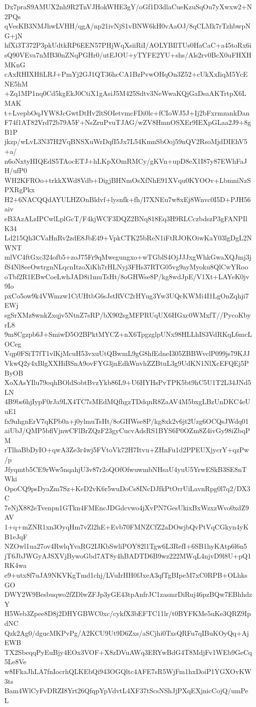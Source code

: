 Dx7praS9AMUX2nh9R2TnVJHokWHE3gY/oGf1D3dlaCueKzuSqOu7yXwxw2+N2PQs
qVesKB3NMJhwLVHH/qgA/np21ivNjS1vBNW6kH0vAaOJ/8qCLMk7rTzhbwpNG+jN
hfXi3T372P3pkUdtkRP6EEN57PHjWqXsiiRiI/AOLYBIlTUs0HaCaC+a45toRx6i
sQ90VEva7nMB30nZNqPGHr0/utEJOU+yTYFE2YU+shs/Als2rv0BcX0uFHXHMKnG
cAxRHIXHfiLRJ+PmYj2GJ1QT36hcCA1BzPvwOHqOn3Z52+cUkXxIiqM5YcENE5hM
+Zq1MP1nq0Cd5kgEkJ0CtiX1gAsiJ5M425Sdtv3NeWwaKQjGaDsaAKTrtpX6LMAK
t+LvepbOqJYW8JcGwtDtHv2ltSOIetvmcFDi0lc+fCIoWJ5J+Ij2bFxrmzankDan
F74f1AT82Vrd72b79A5F+NsZruPvuTJAG/wZV8HmnOSXEr9IEXpGLaa2J9+8gB1P
jkzp/wLvL3N37H2VqBNSXuWrDqfI5Jx7L54KmnSbOoj59nQV2RsoMjdDIEhV5+a/
n6oNxtyHIQEdS5TAocETJ+hLKpXOmRMCy/gKVn+upD8eX1I87y87EWhFaJH/ufP0
WH2KFROo+trkkXWd8Vdb+DigjBHNmOsXfNhE91XVqu0KYOOv+LbmniNzSPXRgPkx
H2+6NACQQdAYULHZOnBldvf+lysnfk+fh/I7XNEu7w8xEj8Wnvc0I5D+PJH56aiv
eB3AzALzIPCwlLplGcT/F4kjWCF3DQZ2BNq818Eq3H9RLCczbdszP3gFANPIlK34
Ld215Qh3CVaHnRv2zdE8JbE49+VpkCTK25bReN1iFtRJOKOiwKaY03lgDgL2NWNT
mlVC4ftGxc324ofb5+zoJ75Fr9qMwegungxo+wTGblS4OjJJJxgWhkGwaXQJmj3j
fS4Nl8eeOwtrgnNLqcnItzoXiKh7rHLNyj3FHs37RTG05vg9ayMyoku8QlCwYRoo
oTbf2R1EBwCoeLwhJAD8i1muTsHt/8oGHWse8P/kg8wdJpE/V1Xt+LAYeK0jv9Io
pxCo5ow9k4VWmzw1CiUHtbG6sJstRVC2rHYug3Yw3UQcKWMi4I1LgOnZqhji7EWj
sgSrXMz8wnkZxqjv5NtnZ7sRP/bX902sgMFPRUqUX6HGxc0WMxfT//PycoKbyrL8
9m8Cgzpb6J+SmiwD5O2BPktMYCZ+nX6TpgzglpUNx98HLLhIS3VdRKqL6mcLOCeg
Vqp0FSiT7fT1vlKjMcuH53vxuUtQBwmL9gG8hfEdneI305ZBBWvclP099js79KJJ
VkwQ2y4xBlgXXHiBSnA9ovFYG3jnEdkWnvhZZBtuL3g9UdKN1NlXcEFQEj5PByOB
XoXAsYIlu79oqhBOldSobtBvzYkb86L9+U6HYHsPvTPK5bt9hC5U1T2L34JNd5LN
4B9bs6hjIypF0rJa9LX4TC7sMEdMQfhgzTDdqnR8ZaAV4M5bxgLBzUnDKC4eUuE1
fx9uhgnErV7qKPb0a+j0ylmuTsHt/8oGHWse8P/kg8xk2v6jt2Uzg6OCQsJWdq01
aiUbJ/QMP5bflVjnwCFlBrZQzF23gyCucvAdsRS1BYS6P0OZm8Z4ivGy98iZbqPM
rTlhaBbDyIO+qwA3Ze3r4wj5FVtoVk72H7Itvu+ZHnFu1d2PPEUXjycrY+qzPw/p
Jfyqmtb5CE9rWw5nqahjU3v87r2oQOfOfwuwmbNHsaU4yuU5YrwESkB3SE8nTWki
OpoCQ9psDyaZm7Sz+KeD2vK6r5wuDoCs8INcDJfkPtOrrUiLavnRpg0l7q2/DX3C
7eNjX882eTvenpn1GTkn4FMEncJDGdcvwo4jXvPN7GesUkixBxWzxzWvo0xdZ9AV
1+q+mZNR1xn3OyqHm7vZl2hE+Evb70FMNZCfZ2aDOwjbQvPtVqCGkyn4yKB1eJqF
NZOwl1ua27ov4RwlqYvaRG2IJKbSwliPOY82l1Tgw6L3RefI+6SB1hyKAtp6l6n5
jT6JbJWGyAJSXVjBywoGbd7AT8y4hBADTD6B9wz222MWqL4njvD9l8U+pQ1RK4wa
e9+utx8f7uJA9NKVKgTmd1chj/LVuIrHH0fJxeA3qfTgBIpeM7xC0RPB+OLhksGO
DWY2W9Besbuqwo2fZDlwZFJp3yGE43tpAnfrJC1zasmrDiRuj46pzBQw7EBhhdzY
H5Web3Zpee8D8j2DHYGBWC0xc/cykfX3bEFTC11lr/t0BYFKMe5uKe3QRZ9IpdNC
Qzk2Ag0/dgucMKPvPg/A2KCU9Ut9D6Zxs/aSCjhi0TxsQRFu7qIBuKOyQq+AjEWB
TX2SbeqqPyEuBjy4EOx3VOF+X8zDVuAWq3ERYwBdG4T8MdjFv1WEb9GeCq5Le8Ve
w8IFkaJhLA7fnIocrhQLKEbQi943OGQltc4AFE7sR5WjFm1hxDoiP1YGXOvKW3ts
Bam4WlCyFvDRZI8Yrt26QfqpYpVdvtL4XF37tScsNShJjPXqEXjnicCojQ/umPeL
